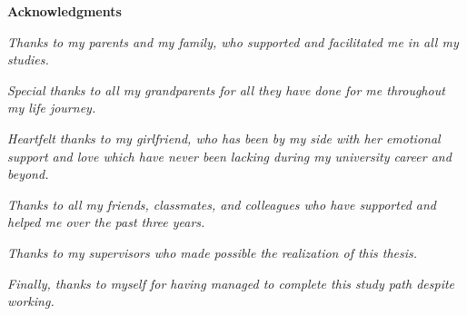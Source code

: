 \thispagestyle{empty}

\begin{center}
  {\bf \Huge Acknowledgments}
\end{center}

\vspace{4cm}

\noindent
\emph{Thanks to my parents and my family, who supported and facilitated me in all my studies.}

\noindent
\emph{Special thanks to all my grandparents for all they have done for me throughout my life journey.}

\vspace{\baselineskip}

\noindent
\emph{Heartfelt thanks to my girlfriend, who has been by my side with her emotional support and love which have never been lacking during my university career and beyond.}

\vspace{\baselineskip}

\noindent
\emph{Thanks to all my friends, classmates, and colleagues who have supported and helped me over the past three years.}

\vspace{\baselineskip}

\noindent
\emph{Thanks to my supervisors who made possible the realization of this thesis.}

\vspace{\baselineskip}

\noindent
\emph{Finally, thanks to myself for having managed to complete this study path despite working.}
